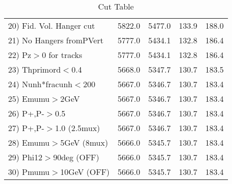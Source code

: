 \begin{table}[h!]
\begin{tabular}{||l||r|r|r|r||}
 20) Fid. Vol. Hanger cut &      5822.0 &      5477.0 &       133.9 &       188.0 \\
 21) No Hangers fromPVert &      5777.0 &      5434.1 &       132.8 &       186.4 \\
 22) Pz$>$0 for tracks    &      5777.0 &      5434.1 &       132.8 &       186.4 \\
 23) Thprimord$<$0.4      &      5668.0 &      5347.7 &       130.7 &       183.5 \\
 24) Nunh*fracunh$<$200   &      5667.0 &      5346.7 &       130.7 &       183.4 \\
 25) Emumu$>$2GeV         &      5667.0 &      5346.7 &       130.7 &       183.4 \\
 26) P+,P-$>$0.5          &      5667.0 &      5346.7 &       130.7 &       183.4 \\
 27) P+,P-$>$1.0 (2.5mux) &      5667.0 &      5346.7 &       130.7 &       183.4 \\
 28) Emumu$>$5GeV  (8mux) &      5666.0 &      5345.7 &       130.7 &       183.4 \\
 29) Phi12$>$90deg  (OFF) &      5666.0 &      5345.7 &       130.7 &       183.4 \\
 30) Pmumu$>$10GeV  (OFF) &      5666.0 &      5345.7 &       130.7 &       183.4 \\
 \hline
 \hline
 \end{tabular}
 \caption{Cut Table \cohpip }
 \label{tab-cut_copip}
 \end{table}
